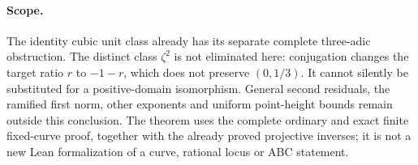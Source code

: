 \paragraph{Scope.}
The identity cubic unit class already has its separate complete
three-adic obstruction. The distinct class \(\zeta^2\) is not
eliminated here: conjugation changes the target ratio \(r\) to
\(-1-r\), which does not preserve \((0,1/3)\). It cannot silently
be substituted for a positive-domain isomorphism. General second
residuals, the ramified first norm, other exponents and uniform
point-height bounds remain outside this conclusion. The theorem
uses the complete ordinary and exact finite fixed-curve proof,
together with the already proved projective inverses; it is not a
new Lean formalization of a curve, rational locus or ABC statement.
